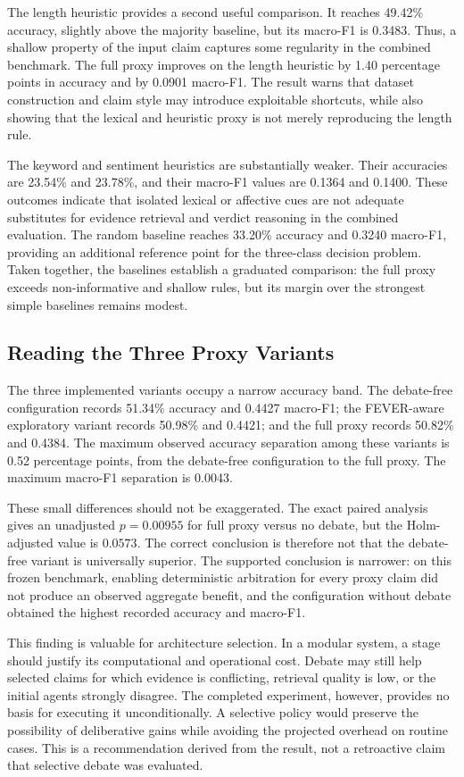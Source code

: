 \documentclass[12pt,a4paper,openany]{report}
\begin{document}
The length heuristic provides a second useful comparison. It reaches 49.42\%
accuracy, slightly above the majority baseline, but its macro-F1 is 0.3483.
Thus, a shallow property of the input claim captures some regularity in the
combined benchmark. The full proxy improves on the length heuristic by
1.40 percentage points in accuracy and by 0.0901 macro-F1. The result warns
that dataset construction and claim style may introduce exploitable
shortcuts, while also showing that the lexical and heuristic proxy is not merely
reproducing the length rule.

The keyword and sentiment heuristics are substantially weaker. Their
accuracies are 23.54\% and 23.78\%, and their macro-F1 values are 0.1364 and
0.1400. These outcomes indicate that isolated lexical or affective cues are
not adequate substitutes for evidence retrieval and verdict reasoning in the
combined evaluation. The random baseline reaches 33.20\% accuracy and 0.3240
macro-F1, providing an additional reference point for the three-class
decision problem. Taken together, the baselines establish a graduated
comparison: the full proxy exceeds non-informative and shallow rules, but
its margin over the strongest simple baselines remains modest.

\subsection{Reading the Three Proxy Variants}
The three implemented variants occupy a narrow accuracy band. The
debate-free configuration records 51.34\% accuracy and 0.4427 macro-F1; the
FEVER-aware exploratory variant records 50.98\% and 0.4421; and the full
proxy records 50.82\% and 0.4384. The maximum observed accuracy separation
among these variants is 0.52 percentage points, from the debate-free
configuration to the full proxy. The maximum macro-F1 separation is 0.0043.

These small differences should not be exaggerated. The exact paired analysis
gives an unadjusted $p=0.00955$ for full proxy versus no debate, but the
Holm-adjusted value is $0.0573$. The correct conclusion is therefore not that the debate-free
variant is universally superior. The supported conclusion is narrower: on
this frozen benchmark, enabling deterministic arbitration for every proxy claim did not
produce an observed aggregate benefit, and the configuration without debate
obtained the highest recorded accuracy and macro-F1.

This finding is valuable for architecture selection. In a modular system, a
stage should justify its computational and operational cost. Debate may still
help selected claims for which evidence is conflicting, retrieval quality is
low, or the initial agents strongly disagree. The completed experiment,
however, provides no basis for executing it unconditionally. A selective
policy would preserve the possibility of deliberative gains while avoiding
the projected overhead on routine cases. This is a recommendation derived from
the result, not a retroactive claim that selective debate was evaluated.
\end{document}

